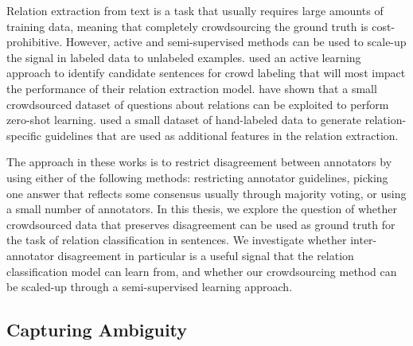 Relation extraction from text is a task that usually requires large amounts of training data, meaning that completely crowdsourcing the ground truth is cost-prohibitive. However, active and semi-supervised methods can be used to scale-up the signal in labeled data to unlabeled examples. \citet{angeli2014combining} used an active learning approach to identify candidate sentences for crowd labeling that will most impact the performance of their relation extraction model. \citet{levy2017zero} have shown that a small crowdsourced dataset of questions about relations can be exploited to perform zero-shot learning. \citet{pershina2014infusion} used a small dataset of hand-labeled data to generate relation-specific guidelines that are used as additional features in the relation extraction.

The approach in these works is to restrict disagreement between annotators by using either of the following methods: restricting annotator guidelines, picking one answer that reflects some consensus usually through majority voting, or using a small number of annotators. In this thesis, we explore the question of whether crowdsourced data that preserves disagreement can be used as ground truth for the task of relation classification in sentences. We investigate whether inter-annotator disagreement in particular is a useful signal that the relation classification model can learn from, and whether our crowdsourcing method can be scaled-up through a semi-supervised learning approach.


\subsection{Capturing Ambiguity}


